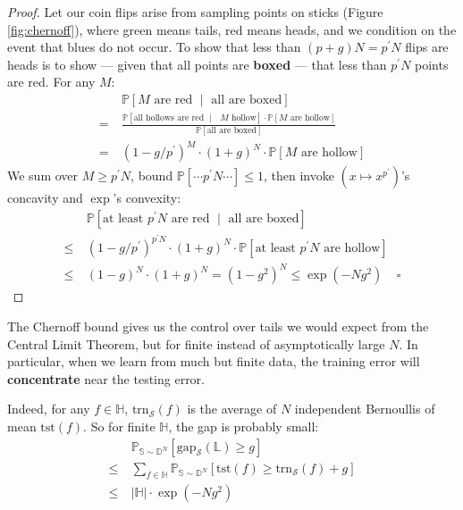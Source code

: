 \documentclass[11pt, justified]{tufte-book}
\newcommand{\Ein}  {\text{trn}_{\sS}}
\newcommand{\Egap} {\text{gap}_{\sS}}
\newcommand{\Eout} {\text{tst}}
\newcommand{\Dd}{\mathbb{D}}\newcommand{\dD}{\mathcal{D}}
\newcommand{\Hh}{\mathbb{H}}\newcommand{\hH}{\mathcal{H}}
\newcommand{\Ll}{\mathbb{L}}\newcommand{\lL}{\mathcal{L}}
\newcommand{\Pp}{\mathbb{P}}\newcommand{\pP}{\mathcal{P}}
\newcommand{\Ss}{\mathbb{S}}\newcommand{\sS}{\mathcal{S}}
\theoremstyle{definition}
\begin{document}
        \begin{proof} \renewcommand{\qedsymbol}{}
            Let our coin flips arise from sampling points on sticks
            (Figure \ref{fig:chernoff}), where green means tails, red
            means heads, and we condition on the event that blues do not occur.
            To show that less than $(p+g)N = p^\prime N$ flips are
            heads is to show --- given that all points are \textbf{boxed} ---
            that less than $p^\prime N$ points are red. 
            For any $M$:
            {%
            \begin{align*}
                    & ~ \Pp[\text{$M$ are red $\mid$ all are boxed}] \\
                  = & ~ \frac{\Pp[\text{all hollows are red $\mid$ $M$ hollow}] \cdot \Pp[\text{$M$ are hollow}]}{\Pp[\text{all are boxed}] } \\
                  = & ~ (1 - g/p^\prime)^{M} \cdot (1+g)^{N} \cdot \Pp[\text{$M$ are hollow}]
            \end{align*}
            }%
            We sum over $M\geq p^\prime N$, bound $\Pp[\cdots p^\prime N \cdots] \leq 1$,
            then invoke $(x \mapsto x^{p^\prime})$'s concavity and
            $\exp$'s convexity:
            \begin{align*}
                &~\Pp[\text{at least $p^\prime N$ are red $\mid$ all are boxed}]
                \\ \leq
                &~(1 - g/p^\prime)^{p^\prime N} \cdot (1+g)^{N} \cdot \Pp[\text{at least $p^\prime N$ are hollow}]
                \\ \leq
                &~(1 - g)^N \cdot (1 + g)^{N}
                =
                (1 - g^2)^N
                \leq
                \exp(- Ng^2)
                ~~~~~\square
            \end{align*}
        \end{proof}
        \vspace{-0.5cm}
        The Chernoff bound gives us the control over tails we would expect from the
        Central Limit Theorem, but for finite instead of asymptotically large
        $N$.  In particular, when we learn from much but finite data, the
        training error will \textbf{concentrate} near the testing error.

        Indeed, for any $f\in \Hh$, $\Ein(f)$ is the average of $N$ independent 
        Bernoullis of mean $\Eout(f)$.  So for finite $\Hh$, the gap is
        probably small:
        \begin{align*}
            &~\Pp_{\Ss\sim \Dd^N}[\Egap(\Ll) \geq g] \\
            \leq 
            &~\sum_{f\in \Hh} \Pp_{\Ss\sim \Dd^N}[\Eout(f) \geq \Ein(f) + g] \\
            \leq
            &~|\Hh| \cdot \exp(-Ng^2)
        \end{align*}
\end{document}
